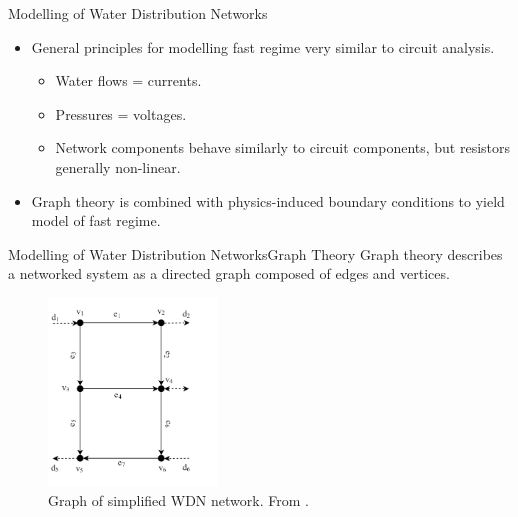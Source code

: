 
\begin{frame}{Modelling of Water Distribution Networks}
	\begin{itemize}
		\item General principles for modelling fast regime very similar to circuit analysis.
		\begin{itemize}
			\item Water flows = currents.
			\item Pressures = voltages.
			\item Network components behave similarly to circuit components, but resistors generally non-linear.
		\end{itemize}
		\item Graph theory is combined with physics-induced boundary conditions to yield model of fast regime.
	\end{itemize}
\end{frame}



\begin{frame}{Modelling of Water Distribution Networks}{Graph Theory}
	Graph theory describes a networked system as a directed graph composed of edges and vertices.
	
	\begin{figure}[h!]
		\centering
		\includegraphics[width=0.4\textwidth]{Topics/SystemModel/Graphics/Graph.png}
		\caption{Graph of simplified WDN network. From \cite{Rathore930}.}
		\label{fig:graph}
	\end{figure}
	
\end{frame}


